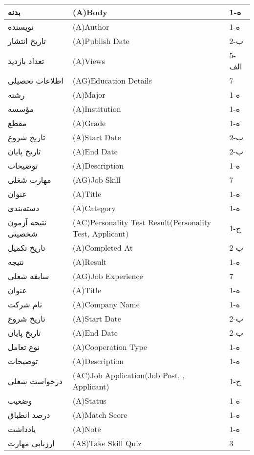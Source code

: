 \documentclass[12pt]{article}
\begin{document}
\begin{longtable}{|l|l|l|}
		بدنه & (A)Body & 1-ه   \\
		\hline
		نویسنده & (A)Author & 1-ه   \\
		\hline
		تاریخ انتشار & (A)Publish Date & 2-ب   \\
		\hline
		تعداد بازدید & (A)Views & 5-الف \\
		\hline
		اطلاعات تحصیلی & (AG)Education Details & 7     \\
		\hline
		رشته & (A)Major & 1-ه   \\
		\hline
		مؤسسه & (A)Institution & 1-ه   \\
		\hline
		مقطع & (A)Grade & 1-ه   \\
		\hline
		تاریخ شروع & (A)Start Date & 2-ب   \\
		\hline
		تاریخ پایان & (A)End Date & 2-ب   \\
		\hline
		توضیحات & (A)Description & 1-ه   \\
		\hline
		مهارت شغلی & (AG)Job Skill & 7     \\
		\hline
		عنوان & (A)Title & 1-ه   \\
		\hline
		دسته‌بندی & (A)Category & 1-ه   \\
		\hline
		نتیجه آزمون شخصیتی & (AC)Personality Test Result(Personality Test, Applicant) & 1-ج   \\
		\hline
		تاریخ تکمیل & (A)Completed At & 2-ب   \\
		\hline
		نتیجه & (A)Result & 1-ه   \\
		\hline
		سابقه شغلی & (AG)Job Experience & 7     \\
		\hline
		عنوان & (A)Title & 1-ه   \\
		\hline
		نام شرکت & (A)Company Name & 1-ه   \\
		\hline
		تاریخ شروع & (A)Start Date & 2-ب   \\
		\hline
		تاریخ پایان & (A)End Date & 2-ب   \\
		\hline
		نوع تعامل & (A)Cooperation Type & 1-ه   \\
		\hline
		توضیحات & (A)Description & 1-ه   \\
		\hline
		درخواست شغلی & (AC)Job Application(Job Post, , Applicant) & 1-ج   \\
		\hline
		وضعیت & (A)ُStatus & 1-ه   \\
		\hline
		درصد انطباق & (A)Match Score & 1-ه   \\
		\hline
		یادداشت & (A)ُNote & 1-ه   \\
		\hline
		ارزیابی مهارت & (AS)Take Skill Quiz & 3     \\
		\hline

\end{longtable}
\end{document}
